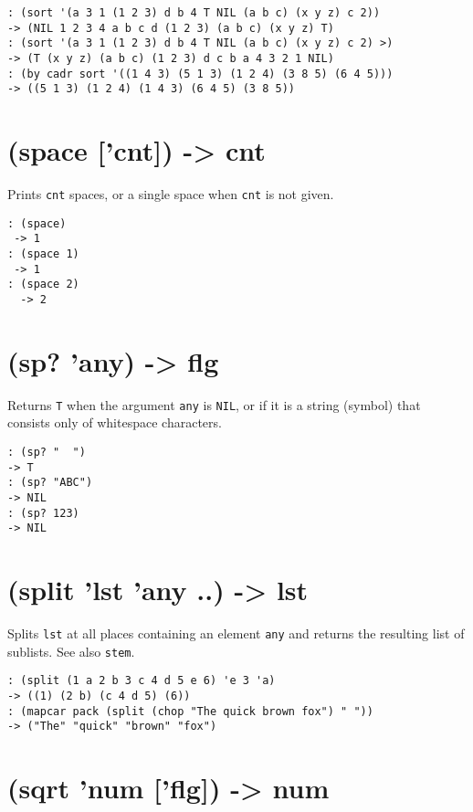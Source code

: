 {{{{{{{{\begin{verbatim}
: (sort '(a 3 1 (1 2 3) d b 4 T NIL (a b c) (x y z) c 2))
-> (NIL 1 2 3 4 a b c d (1 2 3) (a b c) (x y z) T)
: (sort '(a 3 1 (1 2 3) d b 4 T NIL (a b c) (x y z) c 2) >)
-> (T (x y z) (a b c) (1 2 3) d c b a 4 3 2 1 NIL)
: (by cadr sort '((1 4 3) (5 1 3) (1 2 4) (3 8 5) (6 4 5)))
-> ((5 1 3) (1 2 4) (1 4 3) (6 4 5) (3 8 5))
\end{verbatim}

 
\section{(space ['cnt]) -> cnt}
\label{sec-8-1-19-28}


Prints \texttt{cnt} spaces, or a single space when \texttt{cnt} is not given.


\begin{verbatim}
: (space)
 -> 1
: (space 1)
 -> 1
: (space 2)
  -> 2
\end{verbatim}

 
\section{(sp? 'any) -> flg}
\label{sec-8-1-19-29}


Returns \texttt{T} when the argument \texttt{any} is \texttt{NIL}, or if it is a string
(symbol) that consists only of whitespace characters.


\begin{verbatim}
: (sp? "  ")
-> T
: (sp? "ABC")
-> NIL
: (sp? 123)
-> NIL
\end{verbatim}

 
\section{(split 'lst 'any ..) -> lst}
\label{sec-8-1-19-30}


Splits \texttt{lst} at all places containing an element \texttt{any} and returns the
resulting list of sublists. See also \texttt{stem}.


\begin{verbatim}
: (split (1 a 2 b 3 c 4 d 5 e 6) 'e 3 'a)
-> ((1) (2 b) (c 4 d 5) (6))
: (mapcar pack (split (chop "The quick brown fox") " "))
-> ("The" "quick" "brown" "fox")
\end{verbatim}

 
\section{(sqrt 'num ['flg]) -> num}
\label{sec-8-1-19-31}


}}}}}}}}
